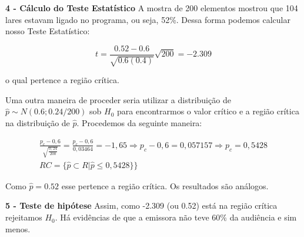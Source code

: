 \documentclass[
  letterpaper,
  DIV=11,
  numbers=noendperiod]{scrartcl}
\begin{document}
\textbf{4 - Cálculo do Teste Estatístico} A mostra de 200 elementos
mostrou que 104 lares estavam ligado no programa, ou seja, 52\%. Dessa
forma podemos calcular nosso Teste Estatístico:

\[t=\frac{0.52-0.6}{\sqrt{0.6(0.4)}}\sqrt{200} = -2.309\]

o qual pertence a região crítica.

Uma outra maneira de proceder seria utilizar a distribuição de
\(\hat{p} \sim N(0.6; 0.24/200)\) sob \(H_0\) para encontrarmos o valor
crítico e a região crítica na distribuição de \(\hat{p}\). Procedemos da
seguinte maneira:

\[\begin{array}{ccc}
\frac{p_{c}-0,6}{\sqrt{\frac{0,24}{200}}}=\frac{p_c-0,6}{0,03464}=-1,65\Rightarrow p_c-0,6=0,057157 \Rightarrow p_c=0,5428
\\
RC=\{\hat{p} \subset R | \hat{p}\leq0,5428\}\}
\end{array}\]

Como \(\hat{p}=0.52\) esse pertence a região crítica. Os resultados são
análogos.

\vspace{0.5cm}

\textbf{5 - Teste de hipótese} Assim, como -2.309 (ou 0.52) está na
região crítica rejeitamos \(H_0\). Há evidências de que a emissora não
teve \(60\%\) da audiência e sim menos.
\end{document}

